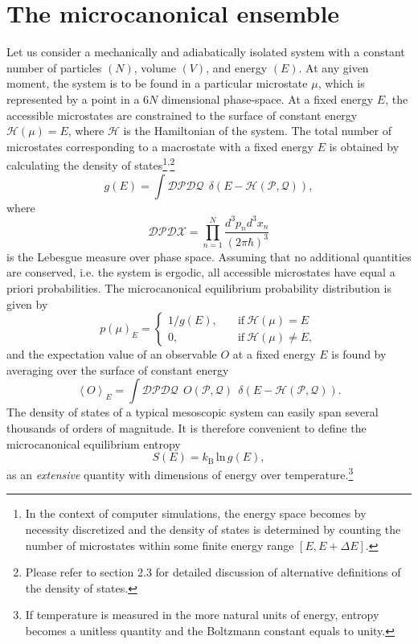 \documentclass[12pt]{report}
\begin{document}
\section{The microcanonical ensemble}
Let us consider a mechanically and adiabatically isolated system with a constant number of particles $(N)$, volume $(V)$, and energy $(E)$. At any given moment, the system is to be found in a particular microstate $\mu$, which is represented by a point in a $6N$ dimensional phase-space. At a fixed energy $E$, the accessible microstates are constrained to the surface of constant energy $\mathcal{H}(\mu) = E$, where $\mathcal{H}$ is the Hamiltonian of the system. The total number of microstates corresponding to a macrostate with a fixed energy $E$ is obtained by calculating the density of states\footnote{In the context of computer simulations, the energy space becomes by necessity discretized and the density of states is determined by counting the number of microstates within some finite energy range $[E,E+\Delta E]$.}\textsuperscript{,}\footnote{Please refer to section 2.3 for detailed discussion of alternative definitions of the density of states.}
\begin{equation}
g(E) = \int \mathcal{DP}\mathcal{DQ} \:\: \delta(E - \mathcal{H}(\mathcal{P},\mathcal{Q})),
\end{equation} 
where 
\begin{equation}
\mathcal{DP}\mathcal{DX} = \prod_{n = 1}^{N} \frac{d^{3}p_{n}d^{3}x_{n}}{(2 \pi \hbar)^{3}}
\end{equation}
is the Lebesgue measure over phase space.
Assuming that no additional quantities are conserved, i.e. the system is ergodic, all accessible microstates have equal a priori probabilities. The microcanonical equilibrium probability distribution is given by 
\begin{equation}
p(\mu)_{E} = \left\{
\begin{array}{lr}
1/g(E), & \quad
\mathrm{if} \: \mathcal{H(\mu)} = E\\
0, & \quad \mathrm{if} \: \mathcal{H(\mu)} \neq E,
\end{array}
\right.
\end{equation}
and the expectation value of an observable $O$ at a fixed energy $E$ is found by averaging over the surface of constant energy
\begin{equation}
\left< O \right>_{E} = \int \mathcal{DP}\mathcal{DQ} \:\: O(\mathcal{P},\mathcal{Q}) \:\: \delta(E - \mathcal{H}(\mathcal{P},\mathcal{Q})).
\end{equation}
The density of states of a typical mesoscopic system can easily span several thousands of orders of magnitude. It is therefore convenient to define the microcanonical equilibrium entropy
\begin{equation}
S(E) = k_\mathrm{B}\, \mathrm{ln}\, g(E),
\end{equation}
as an \textit{extensive} quantity with dimensions of energy over temperature.\footnote{If temperature is measured in the more natural units of energy, entropy becomes a unitless quantity and the Boltzmann constant equals to unity.}
\end{document}
